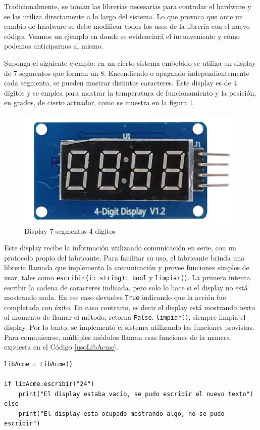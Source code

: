 Tradicionalmente, se toman las librerías necesarias para controlar el hardware y se las utiliza directamente a lo largo del sistema. Lo que provoca que ante un cambio de hardware se debe modificar todos los usos de la librería con el nuevo código. Veamos un ejemplo en donde se evidenciará el inconveniente y cómo podemos anticiparnos al mismo.

Suponga el siguiente ejemplo: en un cierto sistema embebido se utiliza un display de 7 segmentos que forman un 8. Encendiendo o apagando independientemente cada segmento, se pueden mostrar distintos caracteres. Este display es de 4 dígitos y se emplea para mostrar la temperatura de funcionamiento y la posición, en grados, de cierto actuador, como se muestra en la figura \ref{fig:enter-label}.

\begin{figure}[h]
    \centering
    \includegraphics[width=0.4\linewidth]{display.png}
    \caption{Display 7 segmentos 4 digitos}
    \label{fig:enter-label}
\end{figure}


Este display recibe la información utilizando comunicación en serie, con un protocolo propio del fabricante. Para facilitar su uso, el fabricante brinda una librería llamada \LibAcme que implementa la comunicación y provee funciones simples de usar, tales como \verb|escribir(i: string): bool| y \verb|limpiar()|. La primera intenta escribir la cadena de caracteres indicada, pero solo lo hace si el display no está mostrando nada. En ese caso devuelve \verb|True| indicando que la acción fue completada con éxito. En caso contrario, es decir el display está mostrando texto al momento de llamar el método, retorna \verb|False|. \verb|limpiar()|, siempre limpia el display. Por lo tanto, se implementó el sistema utilizando las funciones provistas. Para comunicarse, múltiples módulos llaman esas funciones de la manera expuesta en el Código \ref{usoLibAcme}.

\begin{lstlisting}[label={usoLibAcme}, caption=Ejemplo de uso de la libreria LibAcme.]
libAcme = LibAcme()

if libAcme.escribir("24")
	print("El display estaba vacio, se pudo escribir el nuevo texto")
else
	print("El display esta ocupado mostrando algo, no se pudo escribir")

\end{lstlisting}

